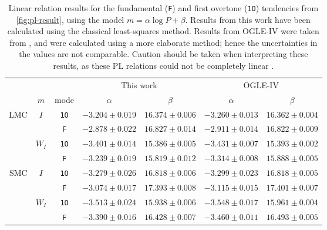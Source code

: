 \begin{table}
	\centering
	\begin{tabular}{rcc|cc|cc}
	    &      &  & \multicolumn{2}{c}{This work} & \multicolumn{2}{|c}{OGLE-IV} \\ 
		&  $m$  & mode & $\alpha$ & $\beta$ & $\alpha$ & $\beta$  \\ \hline
	\multirow{4}{*}{LMC} & \multirow{2}{*}{$I$}   & \texttt{1O} & $-3.204 \pm 0.019$ & $16.374 \pm 0.006$ &        $-3.260 \pm 0.013$ & $16.362 \pm 0.004$ \\
	                     &                        & \texttt{F}  & $-2.878 \pm 0.022$ & $16.827 \pm 0.014$ &        $-2.911 \pm 0.014$ & $16.822 \pm 0.009$ \\ \cline{2-7}
						 & \multirow{2}{*}{$W_I$} & \texttt{1O} & $-3.401 \pm 0.014$ & $15.386 \pm 0.005$ &        $-3.431 \pm 0.007$ & $15.393 \pm 0.002$ \\
						 &						  & \texttt{F}  & $-3.239 \pm 0.019$ & $15.819 \pm 0.012$ &        $-3.314 \pm 0.008$ & $15.888 \pm 0.005$ \\ \hline
	\multirow{4}{*}{SMC} & \multirow{2}{*}{$I$}   & \texttt{1O} & $-3.279 \pm 0.026$ & $16.818 \pm 0.006$ &        $-3.299 \pm 0.023$ & $16.818 \pm 0.005$ \\ 
						 &						  & \texttt{F}  & $-3.074 \pm 0.017$ & $17.393 \pm 0.008$ &        $-3.115 \pm 0.015$ & $17.401 \pm 0.007$ \\\cline{2-7}
						 & \multirow{2}{*}{$W_I$} & \texttt{1O} & $-3.513 \pm 0.024$ & $15.938 \pm 0.006$ &        $-3.548 \pm 0.017$ & $15.961 \pm 0.004$ \\ 
						 &                        & \texttt{F}  & $-3.390 \pm 0.016$ & $16.428 \pm 0.007$ &        $-3.460 \pm 0.011$ & $16.493 \pm 0.005$
	\end{tabular}
	\caption[Results: linear regressions for the PL relations]{
		Linear relation results for the fundamental (\texttt{F}) and first overtone (\texttt{1O}) tendencies from \autoref{fig:pl-result}, using the model $m=\alpha \log P + \beta$.
		Results from this work have been calculated using the classical least-squares method. 
		Results from OGLE-IV were taken from \cite{OGLE2016}, and were calculated using a more elaborate method; hence the uncertainties in the values are not comparable.
		Caution should be taken when interpreting these results, as these PL relations could not be completely linear \citep{Ngeow2009}.
	}
	\label{tab:results}
\end{table}
	

